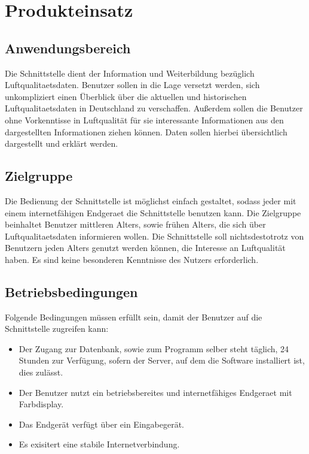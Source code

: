 \section{Produkteinsatz}
\subsection{Anwendungsbereich}
Die Schnittstelle dient der Information und Weiterbildung bezüglich \gls{Luftqualitaetsdaten}. 
Benutzer sollen in die Lage versetzt werden, sich unkompliziert
einen Überblick über die aktuellen und historischen \gls{Luftqualitaetsdaten} in Deutschland zu verschaffen.
Außerdem sollen die Benutzer ohne Vorkenntisse in Luftqualität für sie interessante Informationen aus den dargestellten
Informationen ziehen können. Daten sollen hierbei übersichtlich dargestellt und erklärt werden.
\subsection{Zielgruppe}
Die Bedienung der Schnittstelle ist möglichst einfach gestaltet, sodass jeder mit einem internetfähigen \Gls{Endgeraet} die Schnittstelle benutzen kann.
Die Zielgruppe beinhaltet Benutzer mittleren Alters, sowie frühen Alters, die sich über \gls{Luftqualitaetsdaten} informieren wollen. 
Die Schnittstelle soll nichtsdestotrotz von Benutzern jeden Alters genutzt werden können, die Interesse an Luftqualität haben.
Es sind keine besonderen Kenntnisse des Nutzers erforderlich.
\subsection{Betriebsbedingungen}
Folgende Bedingungen müssen erfüllt sein, damit der Benutzer auf die Schnittstelle zugreifen kann:
\begin{itemize}
    \item Der Zugang zur Datenbank, sowie zum Programm selber steht täglich,
    24 Stunden zur Verfügung, sofern der Server, auf dem die Software installiert ist,
    dies zulässt.
    \item Der Benutzer nutzt ein betriebsbereites und internetfähiges \gls{Endgeraet} mit Farbdisplay.
    \item Das Endgerät verfügt über ein Eingabegerät.
    \item Es exisitert eine stabile Internetverbindung.
\end{itemize}